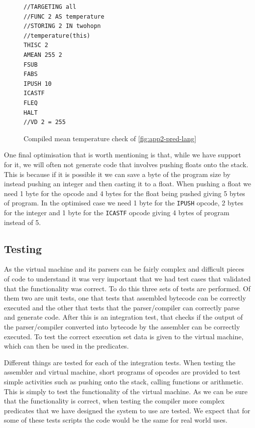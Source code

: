 \begin{figure}[H]
\begin{lstlisting}[language=Dragon]
//TARGETING all
//FUNC 2 AS temperature
//STORING 2 IN twohopn
//temperature(this)
THISC 2
AMEAN 255 2
FSUB
FABS
IPUSH 10
ICASTF
FLEQ
HALT
//VD 2 = 255
\end{lstlisting}
\caption{Compiled mean temperature check of \autoref{fig:app2-pred-lang}}
\label{fig:app2-pred-lang-compiled}
\end{figure}

One final optimisation that is worth mentioning is that, while we have support for it, we will often not generate code that involves pushing floats onto the stack. This is because if it is possible it we can save a byte of the program size by instead pushing an integer and then casting it to a float. When pushing a float we need 1 byte for the opcode and 4 bytes for the float being pushed giving 5 bytes of program. In the optimised case we need 1 byte for the \verb|IPUSH| opcode, 2 bytes for the integer and 1 byte for the \verb|ICASTF| opcode giving 4 bytes of program instead of 5.


\subsection{Testing}

As the virtual machine and its parsers can be fairly complex and difficult pieces of code to understand it was very important that we had test cases that validated that the functionality was correct. To do this three sets of tests are performed. Of them two are unit tests, one that tests that assembled bytecode can be correctly executed and the other that tests that the parser/compiler can correctly parse and generate code. After this is an integration test, that checks if the output of the parser/compiler converted into bytecode by the assembler can be correctly executed. To test the correct execution set data is given to the virtual machine, which can then be used in the predicates.

Different things are tested for each of the integration tests. When testing the assembler and virtual machine, short programs of opcodes are provided to test simple activities such as pushing onto the stack, calling functions or arithmetic. This is simply to test the functionality of the virtual machine. As we can be sure that the functionality is correct, when testing the compiler more complex predicates that we have designed the system to use are tested. We expect that for some of these tests scripts the code would be the same for real world uses.




